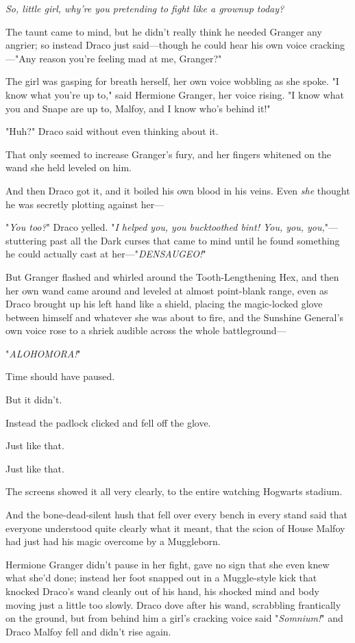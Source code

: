 \emph{So, little girl, why're you pretending to fight like a grownup today?}

The taunt came to mind, but he didn't really think he needed Granger any
angrier; so instead Draco just said---though he could hear his own voice
cracking---"Any reason you're feeling mad at me, Granger?"

The girl was gasping for breath herself, her own voice wobbling as she spoke.
"I know what you're up to," said Hermione Granger, her voice rising. "I know
what you and Snape are up to, Malfoy, and I know who's behind it!"

"Huh?" Draco said without even thinking about it.

That only seemed to increase Granger's fury, and her fingers whitened on the
wand she held leveled on him.

And then Draco got it, and it boiled his own blood in his veins. Even
\emph{she} thought he was secretly plotting against her---

"\emph{You too?}" Draco yelled. "\emph{I helped you, you bucktoothed bint! You,
you, you,}"--- stuttering past all the Dark curses that came to mind until he
found something he could actually cast at her---"\emph{DENSAUGEO!}"

But Granger flashed and whirled around the Tooth-Lengthening Hex, and then her
own wand came around and leveled at almost point-blank range, even as Draco
brought up his left hand like a shield, placing the magic-locked glove between
himself and whatever she was about to fire, and the Sunshine General's own
voice rose to a shriek audible across the whole battleground---

"\emph{ALOHOMORA!}"

Time should have paused.

But it didn't.

Instead the padlock clicked and fell off the glove.

Just like that.

Just like that.

The screens showed it all very clearly, to the entire watching Hogwarts stadium.

And the bone-dead-silent hush that fell over every bench in every stand said
that everyone understood quite clearly what it meant, that the scion of House
Malfoy had just had his magic overcome by a Muggleborn.

Hermione Granger didn't pause in her fight, gave no sign that she even knew
what she'd done; instead her foot snapped out in a Muggle-style kick that
knocked Draco's wand cleanly out of his hand, his shocked mind and body moving
just a little too slowly. Draco dove after his wand, scrabbling frantically on
the ground, but from behind him a girl's cracking voice said "\emph{Somnium!}"
and Draco Malfoy fell and didn't rise again.

